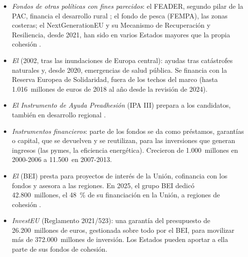 \documentclass[11pt]{article}
\begin{document}
\begin{itemize}
\item \emph{Fondos de otras políticas con fines parecidos}: el FEADER, segundo pilar de la PAC, financia el desarrollo rural ; el fondo de pesca (FEMPA), las zonas costeras; el NextGenerationEU y su Mecanismo de Recuperación y Resiliencia, desde 2021, han sido en varios Estados mayores que la propia cohesión .
\item \emph{El } (2002, tras las inundaciones de Europa central): ayudas tras catástrofes naturales y, desde 2020, emergencias de salud pública. Se financia con la Reserva Europea de Solidaridad, fuera de los techos del marco (hasta 1.016~millones de euros de 2018 al año desde la revisión de 2024)\nocite{UE2024RevisionMFP}.
\item \emph{El Instrumento de Ayuda Preadhesión} (IPA III) prepara a los candidatos, también en desarrollo regional .
\item \emph{Instrumentos financieros}: parte de los fondos se da como préstamos, garantías o capital, que se devuelven y se reutilizan, para las inversiones que generan ingresos (las pymes, la eficiencia energética). Crecieron de 1.000~millones en 2000-2006 a 11.500~en 2007-2013\nocite{CE2018Panorama64}.
\item \emph{El } (BEI) presta para proyectos de interés de la Unión, cofinancia con los fondos y asesora a las regiones. En 2025, el grupo BEI dedicó 42.800~millones, el 48~\% de su financiación en la Unión, a regiones de cohesión\nocite{BEI2026Cohesion} .
\item \emph{InvestEU} (Reglamento 2021/523): una garantía del presupuesto de 26.200~millones de euros, gestionada sobre todo por el BEI, para movilizar más de 372.000~millones de inversión. Los Estados pueden aportar a ella parte de sus fondos de cohesión\nocite{UE2021InvestEU}.
\end{itemize}
\end{document}
